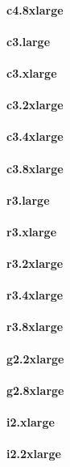 \documentclass{acm_proc_article-sp}
\begin{document}
\paragraph{c4.8xlarge}
\paragraph{c3.large}
\paragraph{c3.xlarge}
\paragraph{c3.2xlarge}
\paragraph{c3.4xlarge}
\paragraph{c3.8xlarge}
\paragraph{r3.large}
\paragraph{r3.xlarge}
\paragraph{r3.2xlarge}
\paragraph{r3.4xlarge}
\paragraph{r3.8xlarge}
\paragraph{g2.2xlarge}
\paragraph{g2.8xlarge}
\paragraph{i2.xlarge}
\paragraph{i2.2xlarge}
\end{document}
